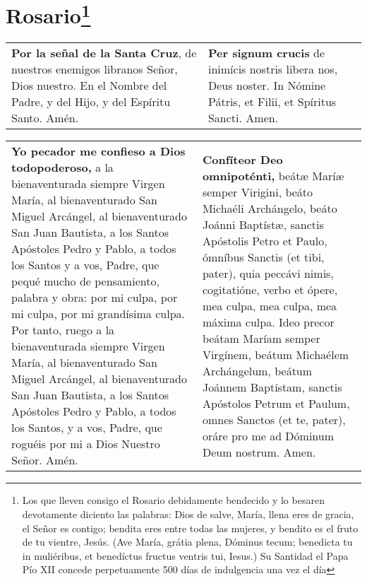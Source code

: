 \documentclass[./rosary.tex]{subfiles}
\begin{document}
\chapter*{Rosario\footnote{Los que lleven consigo el Rosario debidamente bendecido y lo besaren devotamente diciento las palabras:
        Dios de salve, María, llena eres de gracia, el Señor es contigo; bendita eres entre todas las mujeres,
        y bendito es el fruto de tu vientre, Jesús. (Ave María, grátia plena, Dóminus tecum; benedicta tu in muliéribus, et benedíctus fructus ventris tui,
        Iesus.) Su Santidad el Papa Pío XII concede perpetuamente 500 días de indulgencia una vez el día}}

\label{crossSignal}
\begin{longtable} { p{} p{} }
    \textbf{Por la señal de la Santa Cruz}, de nuestros enemigos libranos Señor, Dios nuestro. En el Nombre del Padre,
    y del Hijo, y del Espíritu Santo. Amén.

     &

    \textbf{Per signum crucis} de inimícis nostris libera nos, Deus noster. In Nómine Pátris, et Filii, et Spíritus Sancti. Amen.
\end{longtable}

\label{iConfess}
\begin{longtable} { p{} p{} }
    \textbf{Yo pecador me confieso a Dios todopoderoso,} a la bienaventurada siempre Virgen María, al bienaventurado San Miguel Arcángel,
    al bienaventurado San Juan Bautista, a los Santos Apóstoles Pedro y Pablo, a todos los Santos y a vos, Padre, que pequé mucho
    de pensamiento, palabra y obra: por mi culpa, por mi culpa, por mi grandísima culpa. Por tanto, ruego a la bienaventurada
    siempre Virgen María, al bienaventurado San Miguel Arcángel, al bienaventurado San Juan Bautista, a los Santos Apóstoles
    Pedro y Pablo, a todos los Santos, y a vos, Padre, que roguéis por mi a Dios Nuestro Señor. Amén.
     &
    \textbf{Confíteor Deo omnipoténti,} beátæ Maríæ semper Virigini, beáto Michaéli Archángelo, beáto Joánni Baptístæ, sanctis Apóstolis Petro et Paulo,
    ómníbus Sanctis (et tibi, pater), quia peccávi nimis, cogitatióne, verbo et ópere, mea culpa, mea culpa, mea máxima culpa. Ideo precor beátam
    Maríam semper Virgínem, beátum Michaélem Archángelum, beátum Joánnem Baptístam, sanctis Apóstolos Petrum et Paulum, omnes Sanctos (et te, pater),
    oráre pro me ad Dóminum Deum nostrum. Amen.
\end{longtable}
\end{document}

